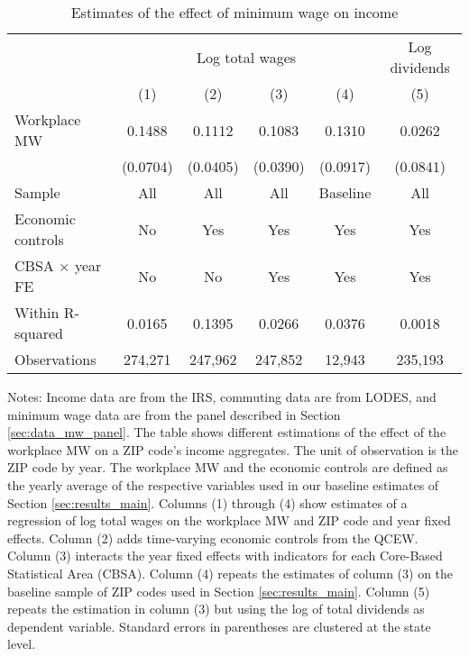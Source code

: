 \begin{table}[hbt!]
    \centering
    \caption{Estimates of the effect of minimum wage on income}
    \label{tab:static_wages}

    \begin{tabular}{@{}lccccc@{}}
        \toprule
                                & \multicolumn{4}{c}{Log total wages}
                                & \multicolumn{1}{c}{Log dividends}                        \\ \cmidrule(lr){2-5}\cmidrule(lr){6-6}
                                & (1)       & (2)      & (3)      & (4)       & (5)        \\ \midrule
        Workplace MW            & 0.1488       & 0.1112      & 0.1083      & 0.1310       & 0.0262        \\
                                & (0.0704)     & (0.0405)    & (0.0390)    & (0.0917)     & (0.0841)      \\ \midrule
        Sample                  & All       & All      & All      & Baseline  & All        \\
        Economic controls       & No        & Yes      & Yes      & Yes       & Yes        \\
        CBSA $\times$ year FE   & No        & No       & Yes      & Yes       & Yes        \\
        Within R-squared        & 0.0165       & 0.1395      & 0.0266      & 0.0376       & 0.0018        \\
        Observations            & 274,271      & 247,962     & 247,852     & 12,943      & 235,193       \\ \bottomrule
    \end{tabular}

    \begin{minipage}{.95\textwidth} \footnotesize
        \vspace{2mm}
        Notes: 
        Income data are from the IRS, commuting data are from LODES, and minimum wage 
        data are from the panel described in Section \ref{sec:data_mw_panel}.
        The table shows different estimations of the effect of the workplace MW
        on a ZIP code's income aggregates.
        The unit of observation is the ZIP code by year.
        The workplace MW and the economic controls are defined as the yearly 
        average of the respective variables used in our baseline estimates of 
        Section \ref{sec:results_main}.
        Columns (1) through (4) show estimates of a regression of log total wages
        on the workplace MW and ZIP code and year fixed effects.
        Column (2) adds time-varying economic controls from the QCEW.
        Column (3) interacts the year fixed effects with indicators for each
        Core-Based Statistical Area (CBSA).
        Column (4) repeats the estimates of column (3) on the baseline sample
        of ZIP codes used in Section \ref{sec:results_main}.
        Column (5) repeats the estimation in column (3) but using the log of 
        total dividends as dependent variable.
        Standard errors in parentheses are clustered at the state level.
    \end{minipage}
\end{table}

